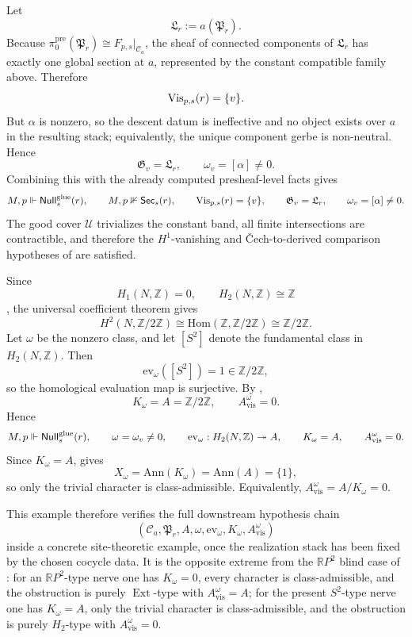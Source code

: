 \begin{example}
Let
\[
\mathfrak L_r:=a(\mathfrak P_r).
\]
Because $\pi_0^{\mathrm{pre}}(\mathfrak P_r)\cong F_{p,s}|_{\mathcal C_a}$, the sheaf of connected components of $\mathfrak L_r$ has exactly one global section at $a$, represented by the constant compatible family above. Therefore
\[
\mathrm{Vis}_{p,s}(r)=\{v\}.
\]
But $\alpha$ is nonzero, so the descent datum is ineffective and no object exists over $a$ in the resulting stack; equivalently, the unique component gerbe is non-neutral. Hence
\[
\mathfrak G_v=\mathfrak L_r,
\qquad
\omega_v=[\alpha]\neq 0.
\]
Combining this with the already computed presheaf-level facts gives
\[
M,p\Vdash \mathsf{Null}^{\mathrm{glue}}_s(r),
\qquad
M,p\nVdash \mathsf{Sec}_s(r),
\qquad
\mathrm{Vis}_{p,s}(r)=\{v\},
\qquad
\mathfrak G_v=\mathfrak L_r,
\qquad
\omega_v=[\alpha]\neq 0.
\]
The good cover $\mathcal U$ trivializes the constant band, all finite intersections are contractible, and therefore the $H^1$-vanishing and \v{C}ech-to-derived comparison hypotheses of  are satisfied.

Since
\[
H_1(N,\mathbb Z) = 0,
\qquad
H_2(N,\mathbb Z) \cong \mathbb Z
\]
\cite[Secs.~2.1, 2.2]{Hatcher2002}, the universal coefficient theorem gives
\[
H^2(N, \mathbb{Z}/2\mathbb{Z})
\cong
\mathrm{Hom}(\mathbb{Z}, \mathbb{Z}/2\mathbb{Z})
\cong
\mathbb{Z}/2\mathbb{Z}.
\]
Let $\omega$ be the nonzero class, and let $[S^2]$ denote the fundamental class in $H_2(N,\mathbb Z)$. Then
\[
\mathrm{ev}_\omega([S^2]) = 1 \in \mathbb{Z}/2\mathbb{Z},
\]
so the homological evaluation map is surjective. By ,
\[
K_\omega = A = \mathbb{Z}/2\mathbb{Z},
\qquad
A_{\mathrm{vis}}^\omega = 0.
\]
Hence
\[
M,p\Vdash \mathsf{Null}^{\mathrm{glue}}_s(r),
\qquad
\omega=\omega_v\neq 0,
\qquad
\mathrm{ev}_{\omega}:H_2(N,\mathbb Z)\twoheadrightarrow A,
\qquad
K_\omega=A,
\qquad
A_{\mathrm{vis}}^\omega=0.
\]
Since $K_\omega = A$,  gives
\[
X_\omega = \mathrm{Ann}(K_\omega) = \mathrm{Ann}(A) = \{1\},
\]
so only the trivial character is class-admissible. Equivalently, $A_{\mathrm{vis}}^\omega = A/K_\omega = 0$.

This example therefore verifies the full downstream hypothesis chain
\[
(\mathcal C_a,\mathfrak P_r,A,\omega,\mathrm{ev}_\omega,K_\omega,A_{\mathrm{vis}}^\omega)
\]
inside a concrete site-theoretic example, once the realization stack has been fixed by the chosen cocycle data. It is the opposite extreme from the $\mathbb{R}P^2$ blind case of : for an $\mathbb{R}P^2$-type nerve one has $K_\omega=0$, every character is class-admissible, and the obstruction is purely $\operatorname{Ext}$-type with $A_{\mathrm{vis}}^\omega=A$; for the present $S^2$-type nerve one has $K_\omega=A$, only the trivial character is class-admissible, and the obstruction is purely $H_2$-type with $A_{\mathrm{vis}}^\omega=0$.
\end{example}

